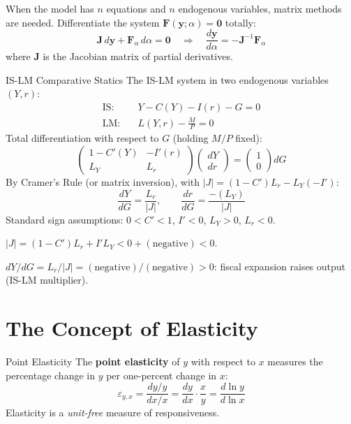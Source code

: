 \documentclass[12pt, a4paper]{article}
\theoremstyle{definition}
\newcommand{\ddd}[2]{\dfrac{d#1}{d#2}}
\begin{document}
When the model has $n$ equations and $n$ endogenous variables, matrix methods
are needed.  Differentiate the system $\mathbf{F}(\mathbf{y};\alpha) = \mathbf{0}$
totally:
\[
  \mathbf{J}\,d\mathbf{y} + \mathbf{F}_\alpha\,d\alpha = \mathbf{0}
  \quad\Rightarrow\quad
  \ddd{\mathbf{y}}{\alpha} = -\mathbf{J}^{-1}\mathbf{F}_\alpha
\]
where $\mathbf{J}$ is the Jacobian matrix of partial derivatives.

\begin{exbox}{IS-LM Comparative Statics}
The IS-LM system in two endogenous variables $(Y,r)$:
\begin{align*}
  \text{IS:} & \quad Y - C(Y) - I(r) - G = 0 \\
  \text{LM:} & \quad L(Y,r) - \frac{M}{P} = 0
\end{align*}
Total differentiation with respect to $G$ (holding $M/P$ fixed):
\[
  \begin{pmatrix}1-C'(Y) & -I'(r)\\ L_Y & L_r\end{pmatrix}
  \begin{pmatrix}dY\\ dr\end{pmatrix}
  =
  \begin{pmatrix}1 \\ 0\end{pmatrix}dG
\]
By Cramer's Rule (or matrix inversion), with $|J| = (1-C')L_r - L_Y(-I')$:
\[
  \ddd{Y}{G} = \frac{L_r}{\lvert J\rvert}, \qquad
  \ddd{r}{G} = \frac{-(L_Y)}{\lvert J\rvert}
\]
Standard sign assumptions: $0<C'<1$, $I'<0$, $L_Y>0$, $L_r<0$.

$|J| = (1-C')L_r + I'L_Y < 0 + (\text{negative}) < 0$.

$dY/dG = L_r/|J| = (\text{negative})/(\text{negative}) > 0$:
fiscal expansion raises output (IS-LM multiplier).
\end{exbox}

\section{The Concept of Elasticity}

\begin{defbox}{Point Elasticity}
The \textbf{point elasticity} of $y$ with respect to $x$ measures the
percentage change in $y$ per one-percent change in $x$:
\[
  \varepsilon_{y,x}
  = \frac{dy/y}{dx/x}
  = \ddd{y}{x}\cdot\frac{x}{y}
  = \ddd{\ln y}{\ln x}
\]
Elasticity is a \emph{unit-free} measure of responsiveness.
\end{defbox}
\end{document}
